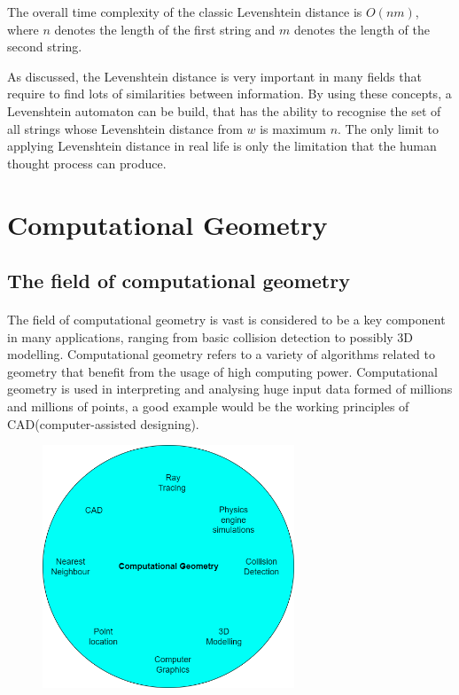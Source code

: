 \documentclass[letterpaper]{article}
\begin{document}
The overall time complexity of the classic Levenshtein distance is $O(nm)$, where $n$ denotes the length of the first string and $m$ denotes the length of the second string. 

As discussed, the Levenshtein distance is very important in many fields that require to find lots of similarities between information. By using these concepts, a Levenshtein automaton can be build, that has the ability to recognise the set of all strings whose Levenshtein distance from $w$ is maximum $n$. The only limit to applying Levenshtein distance in real life is only the limitation that the human thought process can produce. 

\newpage

\section{Computational Geometry}

\subsection{The field of computational geometry}

\paragraph{}

The field of computational geometry is vast is considered to be a key component in many applications, ranging from basic collision detection to possibly 3D modelling. Computational geometry refers to a variety of algorithms related to geometry that benefit from the usage of high computing power. Computational geometry is used in interpreting and analysing huge input data formed of millions and millions of points, a good example would be the working principles of CAD(computer-assisted designing).

\begin{figure} [h!]
\centering
\includegraphics[width=0.67\textwidth]{pngOfDiagrams/thefieldofcomputationalgeometyr.png}
\end{figure}
\end{document}
